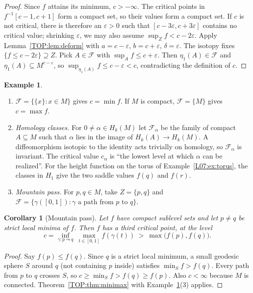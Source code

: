 \documentclass[11pt,openany]{book}
\theoremstyle{plain}
\newtheorem{corollary}[theorem]{Corollary}
\theoremstyle{definition}
\newtheorem{example}[theorem]{Example}
\theoremstyle{remark}
\begin{document}
\begin{proof}
Since $f$ attains its minimum, $c>-\infty$. The critical points in $f^{-1}[c-1,c+1]$ form a compact
set, so their values form a compact set. If $c$ is not critical, there is therefore an $\varepsilon>0$ such
that $[c-3\varepsilon,c+3\varepsilon]$ contains no critical value; shrinking $\varepsilon$, we may also assume
$\sup_Zf<c-2\varepsilon$. Apply Lemma~\ref{TOP:lem:deform} with $a=c-\varepsilon$, $b=c+\varepsilon$,
$\delta=\varepsilon$. The isotopy fixes $\{f\le c-2\varepsilon\}\supseteq Z$. Pick $A\in\mathcal F$ with
$\sup_Af\le c+\varepsilon$. Then $\eta_1(A)\in\mathcal F$ and $\eta_1(A)\subseteq M^{c-\varepsilon}$, so
$\sup_{\eta_1(A)}f\le c-\varepsilon<c$, contradicting the definition of $c$.
\end{proof}

\begin{example}\label{TOP:ex:families}\leavevmode
\begin{enumerate}[nosep]
\item $\mathcal F=\{\{x\}:x\in M\}$ gives $c=\min f$. If $M$ is compact, $\mathcal F=\{M\}$ gives $c=\max f$.
\item \emph{Homology classes.} For $0\neq\alpha\in H_k(M)$ let $\mathcal F_\alpha$ be the family of compact
  $A\subseteq M$ such that $\alpha$ lies in the image of $H_k(A)\to H_k(M)$. A diffeomorphism isotopic to
  the identity acts trivially on homology, so $\mathcal F_\alpha$ is invariant. The critical value
  $c_\alpha$ is ``the lowest level at which $\alpha$ can be realized''. For the height function on the
  torus of Example~\ref{L07:ex:torus}, the classes in $H_1$ give the two saddle values $f(q)$ and $f(r)$.
\item \emph{Mountain pass.} For $p,q\in M$, take $Z=\{p,q\}$ and $\mathcal F=\{\gamma([0,1]):\gamma
  \text{ a path from }p\text{ to }q\}$.
\end{enumerate}
\end{example}

\begin{corollary}[Mountain pass]\label{TOP:cor:mp}
Let $f$ have compact sublevel sets and let $p\neq q$ be strict local minima of $f$. Then $f$ has a third
critical point, at the level
\[
  c=\inf_{\gamma\colon p\leadsto q}\ \max_{t\in[0,1]}f(\gamma(t))\ >\ \max\big(f(p),f(q)\big).
\]
\end{corollary}

\begin{proof}
Say $f(p)\le f(q)$. Since $q$ is a strict local minimum, a small geodesic sphere $S$ around $q$ (not
containing $p$ inside) satisfies $\min_Sf>f(q)$. Every path from $p$ to $q$ crosses $S$, so
$c\ge\min_Sf>f(q)\ge f(p)$. Also $c<\infty$ because $M$ is connected. Theorem~\ref{TOP:thm:minimax}
with Example~\ref{TOP:ex:families}(3) applies.
\end{proof}
\end{document}
